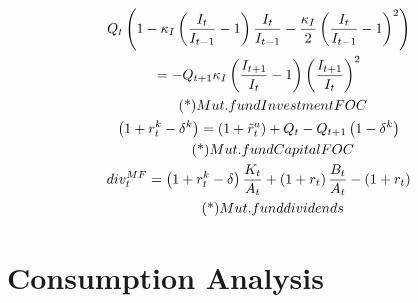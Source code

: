 \begin{gather}
Q_{t}\left(1-\kappa_{I}\left(\frac{I_{t}}{I_{t-1}}-1\right)\frac{I_{t}}{I_{t-1}}-\frac{\kappa_{I}}{2}\left(\frac{I_{t}}{I_{t-1}}-1\right)^{2}\right) \notag \\
= -Q_{t+1}\kappa_{I}\left(\frac{I_{t+1}}{I_{t}}-1\right)\left(\frac{I_{t+1}}{I_{t}}\right)^{2} \\ \eqname{Mut. fund Investment FOC}   \\
 \left(1+r_{t}^{k}-\delta^{k}\right)=\left(1+\tilde{r}_{t}^{a}\right)+Q_{t}-Q_{t+1}\left(1-\delta^{k}\right) \\ \eqname{Mut. fund Capital FOC}   \\
div_{t}^{MF}=\left(1+r_{t}^{k}-\delta\right)\frac{K_{t}}{A_{t}}+\left(1+r_{t}\right)\frac{B_{t}}{A_{t}}-\left(1+r_{t}\right)    \\ \eqname{Mut. fund dividends}   \\
\end{gather}
 
 
 



\section{Consumption Analysis} 


